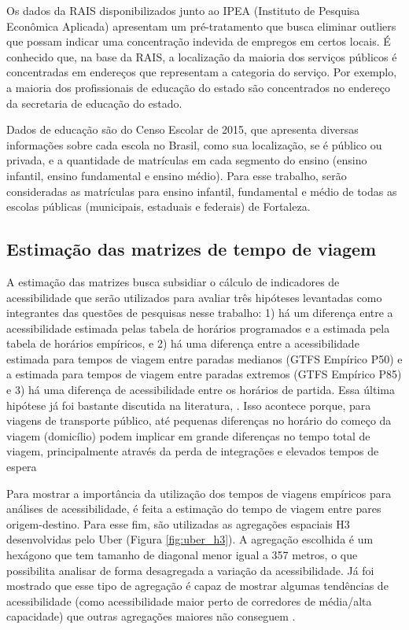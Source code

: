 \documentclass[        
    a4paper,          %
    12pt,             %
    chapter=TITLE,    %
    section=Title,    %
    subsection=Title, %
    oneside,          %
    english,          %
    spanish,          %
    brazil,           %
    fleqn             %
]{abntex2}
\begin{document}
  Os dados da RAIS disponibilizados junto ao IPEA (Instituto de Pesquisa Econômica Aplicada) apresentam um pré-tratamento que busca eliminar outliers que possam indicar uma concentração indevida de empregos em certos locais. É conhecido que, na base da RAIS, a localização da maioria dos serviços públicos é concentradas em endereços que representam a categoria do serviço. Por exemplo, a maioria dos profissionais de educação do estado são concentrados no endereço da secretaria de educação do estado.
  
  Dados de educação são do Censo Escolar de 2015, que apresenta diversas informações sobre cada escola no Brasil, como sua localização, se é público ou privada, e a quantidade de matrículas em cada segmento do ensino (ensino infantil, ensino fundamental e ensino médio). Para esse trabalho, serão consideradas as matrículas para ensino infantil, fundamental e médio de todas as escolas públicas (municipais, estaduais e federais) de Fortaleza.
  
  \hypertarget{estimacao-das-matrizes-de-tempo-de-viagem}{%
  \subsection{Estimação das matrizes de tempo de viagem}\label{estimacao-das-matrizes-de-tempo-de-viagem}}
  
  A estimação das matrizes busca subsidiar o cálculo de indicadores de acessibilidade que serão utilizados para avaliar três hipóteses levantadas como integrantes das questões de pesquisas nesse trabalho: 1) há um diferença entre a acessibilidade estimada pelas tabela de horários programados e a estimada pela tabela de horários empíricos, e 2) há uma diferença entre a acessibilidade estimada para tempos de viagem entre paradas medianos (GTFS Empírico P50) e a estimada para tempos de viagem entre paradas extremos (GTFS Empírico P85) e 3) há uma diferença de acessibilidade entre os horários de partida. Essa última hipótese já foi bastante discutida na literatura, \citep{Stepniak2019, Owen2015}. Isso acontece porque, para viagens de transporte público, até pequenas diferenças no horário do começo da viagem (domicílio) podem implicar em grande diferenças no tempo total de viagem, principalmente através da perda de integrações e elevados tempos de espera \citep{Stepniak2019}
  
  Para mostrar a importância da utilização dos tempos de viagens empíricos para análises de acessibilidade, é feita a estimação do tempo de viagem entre pares origem-destino. Para esse fim, são utilizadas as agregações espaciais H3 desenvolvidas pelo Uber (Figura \ref{fig:uber_h3}). A agregação escolhida é um hexágono que tem tamanho de diagonal menor igual a 357 metros, o que possibilita analisar de forma desagregada a variação da acessibilidade. Já foi mostrado que esse tipo de agregação é capaz de mostrar algumas tendências de acessibilidade (como acessibilidade maior perto de corredores de média/alta capacidade) que outras agregações maiores não conseguem \citep{Pereira2019}.
  
\end{document}
